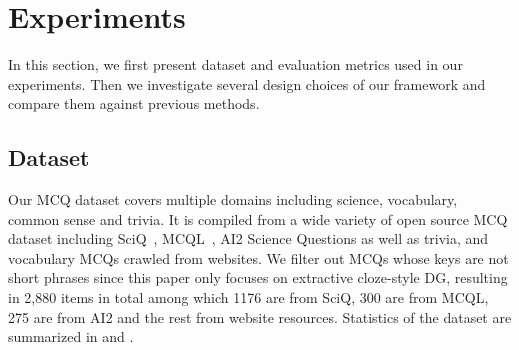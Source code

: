 \section{Experiments}
\label{sec:experiment}
In this section, we first present dataset and evaluation metrics used in our experiments. Then we investigate several design choices of our framework 
and compare them against previous methods.

\subsection{Dataset}
\label{sec:data}

Our MCQ dataset covers multiple domains including science,  
vocabulary, common sense and trivia.
It is compiled from a wide variety of open source  
MCQ dataset including SciQ~\cite{welbl2017crowdsourcing}, 
MCQL~\cite{liang2018distractor}, AI2 Science Questions as well as trivia, and 
vocabulary MCQs crawled from websites. 
We filter out MCQs whose keys are not short phrases since this paper only 
focuses on extractive cloze-style DG, resulting in 2,880 items in total among which 1176 are from SciQ, 300 are from MCQL, 275 are from AI2 and the rest from website resources.
Statistics of the dataset are summarized in  and .



